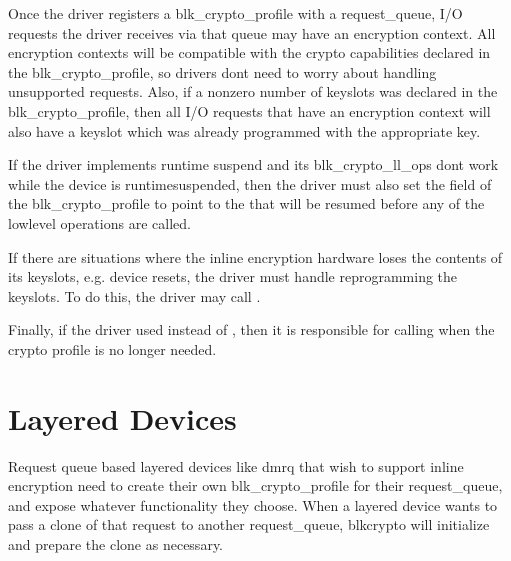 \documentclass[a4paper,11pt,english]{sphinxmanual}
\begin{document}
Once the driver registers a blk\_crypto\_profile with a request\_queue, I/O
requests the driver receives via that queue may have an encryption context.  All
encryption contexts will be compatible with the crypto capabilities declared in
the blk\_crypto\_profile, so drivers don\textquotesingle{}t need to worry about handling
unsupported requests.  Also, if a nonzero number of keyslots was declared in the
blk\_crypto\_profile, then all I/O requests that have an encryption context will
also have a keyslot which was already programmed with the appropriate key.

If the driver implements runtime suspend and its blk\_crypto\_ll\_ops don\textquotesingle{}t work
while the device is runtime\sphinxhyphen{}suspended, then the driver must also set the 
field of the blk\_crypto\_profile to point to the  that will be
resumed before any of the low\sphinxhyphen{}level operations are called.

If there are situations where the inline encryption hardware loses the contents
of its keyslots, e.g. device resets, the driver must handle reprogramming the
keyslots.  To do this, the driver may call .

Finally, if the driver used  instead of
, then it is responsible for calling
 when the crypto profile is no longer needed.


\section{Layered Devices}
\label{\detokenize{inline-encryption:layered-devices}}
Request queue based layered devices like dm\sphinxhyphen{}rq that wish to support inline
encryption need to create their own blk\_crypto\_profile for their request\_queue,
and expose whatever functionality they choose. When a layered device wants to
pass a clone of that request to another request\_queue, blk\sphinxhyphen{}crypto will
initialize and prepare the clone as necessary.
\end{document}
